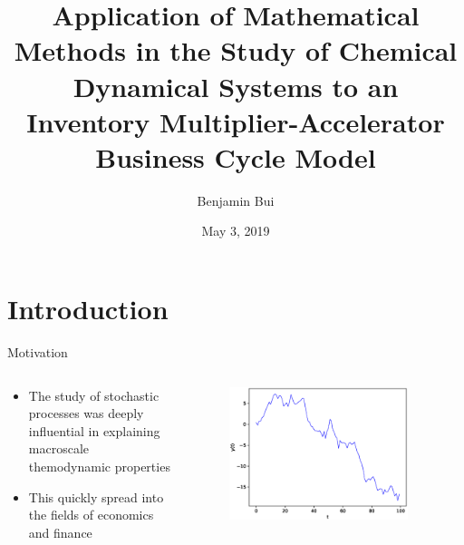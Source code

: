 \documentclass{beamer}
\title{Application of Mathematical Methods in the Study of Chemical Dynamical Systems to an Inventory Multiplier-Accelerator Business Cycle Model}
\author{Benjamin Bui}
\date{May 3, 2019}
\begin{document}
\begin{frame}
	\titlepage
\end{frame}

\section{Introduction}
\begin{frame}{Motivation}
	\begin{columns}
	\begin{column}{0.5\textwidth}
	\begin{itemize}
		\item The study of stochastic processes was deeply influential in explaining macroscale themodynamic properties

		\item This quickly spread into the fields of economics and finance 
	\end{itemize}
	\end{column}
	\begin{column}{0.5\textwidth}
		\begin{figure}
			\centering
			\includegraphics[width=0.9\textwidth]{brownian_motion.eps}
		\end{figure}
	\end{column}
	\end{columns}
\end{frame}
\end{document}
